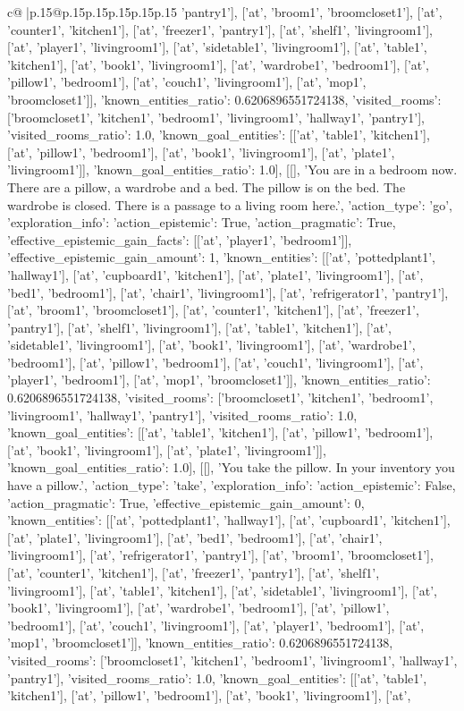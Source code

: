 \documentclass{article}
\begin{document}
{\begin{supertabular}{c@{$\;$}|p{.15\linewidth}@{}p{.15\linewidth}p{.15\linewidth}p{.15\linewidth}p{.15\linewidth}p{.15\linewidth}}
{{{'pantry1'], ['at', 'broom1', 'broomcloset1'], ['at', 'counter1', 'kitchen1'], ['at', 'freezer1', 'pantry1'], ['at', 'shelf1', 'livingroom1'], ['at', 'player1', 'livingroom1'], ['at', 'sidetable1', 'livingroom1'], ['at', 'table1', 'kitchen1'], ['at', 'book1', 'livingroom1'], ['at', 'wardrobe1', 'bedroom1'], ['at', 'pillow1', 'bedroom1'], ['at', 'couch1', 'livingroom1'], ['at', 'mop1', 'broomcloset1']], 'known_entities_ratio': 0.6206896551724138, 'visited_rooms': ['broomcloset1', 'kitchen1', 'bedroom1', 'livingroom1', 'hallway1', 'pantry1'], 'visited_rooms_ratio': 1.0, 'known_goal_entities': [['at', 'table1', 'kitchen1'], ['at', 'pillow1', 'bedroom1'], ['at', 'book1', 'livingroom1'], ['at', 'plate1', 'livingroom1']], 'known_goal_entities_ratio': 1.0}}], [[], 'You are in a bedroom now. There are a pillow, a wardrobe and a bed. The pillow is on the bed. The wardrobe is closed. There is a passage to a living room here.', {'action_type': 'go', 'exploration_info': {'action_epistemic': True, 'action_pragmatic': True, 'effective_epistemic_gain_facts': [['at', 'player1', 'bedroom1']], 'effective_epistemic_gain_amount': 1, 'known_entities': [['at', 'pottedplant1', 'hallway1'], ['at', 'cupboard1', 'kitchen1'], ['at', 'plate1', 'livingroom1'], ['at', 'bed1', 'bedroom1'], ['at', 'chair1', 'livingroom1'], ['at', 'refrigerator1', 'pantry1'], ['at', 'broom1', 'broomcloset1'], ['at', 'counter1', 'kitchen1'], ['at', 'freezer1', 'pantry1'], ['at', 'shelf1', 'livingroom1'], ['at', 'table1', 'kitchen1'], ['at', 'sidetable1', 'livingroom1'], ['at', 'book1', 'livingroom1'], ['at', 'wardrobe1', 'bedroom1'], ['at', 'pillow1', 'bedroom1'], ['at', 'couch1', 'livingroom1'], ['at', 'player1', 'bedroom1'], ['at', 'mop1', 'broomcloset1']], 'known_entities_ratio': 0.6206896551724138, 'visited_rooms': ['broomcloset1', 'kitchen1', 'bedroom1', 'livingroom1', 'hallway1', 'pantry1'], 'visited_rooms_ratio': 1.0, 'known_goal_entities': [['at', 'table1', 'kitchen1'], ['at', 'pillow1', 'bedroom1'], ['at', 'book1', 'livingroom1'], ['at', 'plate1', 'livingroom1']], 'known_goal_entities_ratio': 1.0}}], [[], 'You take the pillow. In your inventory you have a pillow.', {'action_type': 'take', 'exploration_info': {'action_epistemic': False, 'action_pragmatic': True, 'effective_epistemic_gain_amount': 0, 'known_entities': [['at', 'pottedplant1', 'hallway1'], ['at', 'cupboard1', 'kitchen1'], ['at', 'plate1', 'livingroom1'], ['at', 'bed1', 'bedroom1'], ['at', 'chair1', 'livingroom1'], ['at', 'refrigerator1', 'pantry1'], ['at', 'broom1', 'broomcloset1'], ['at', 'counter1', 'kitchen1'], ['at', 'freezer1', 'pantry1'], ['at', 'shelf1', 'livingroom1'], ['at', 'table1', 'kitchen1'], ['at', 'sidetable1', 'livingroom1'], ['at', 'book1', 'livingroom1'], ['at', 'wardrobe1', 'bedroom1'], ['at', 'pillow1', 'bedroom1'], ['at', 'couch1', 'livingroom1'], ['at', 'player1', 'bedroom1'], ['at', 'mop1', 'broomcloset1']], 'known_entities_ratio': 0.6206896551724138, 'visited_rooms': ['broomcloset1', 'kitchen1', 'bedroom1', 'livingroom1', 'hallway1', 'pantry1'], 'visited_rooms_ratio': 1.0, 'known_goal_entities': [['at', 'table1', 'kitchen1'], ['at', 'pillow1', 'bedroom1'], ['at', 'book1', 'livingroom1'], ['at', }}}
\end{supertabular}}
\end{document}
